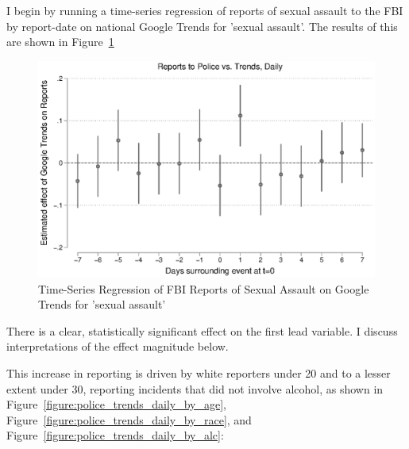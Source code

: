 \documentclass[AER,draftmode]{AEA}
\begin{document}
I begin by running a time-series regression of reports of sexual assault to the FBI by report-date on national Google Trends for 'sexual assault'. The results of this are shown in Figure~\ref{figure:police_trends_daily}

\begin{figure}
\includegraphics[width=\linewidth]{figures/police_trend_daily.eps}
\caption{Time-Series Regression of FBI Reports of Sexual Assault on Google Trends for 'sexual assault'} \label{figure:police_trends_daily}
\end{figure}

There is a clear, statistically significant effect on the first lead variable.  I discuss interpretations of the effect magnitude below. 

This increase in reporting is driven by white reporters under 20 and to a lesser extent under 30, reporting incidents that did not involve alcohol, as shown in Figure~\ref{figure:police_trends_daily_by_age}, Figure~\ref{figure:police_trends_daily_by_race}, and Figure~\ref{figure:police_trends_daily_by_alc}:
\end{document}
